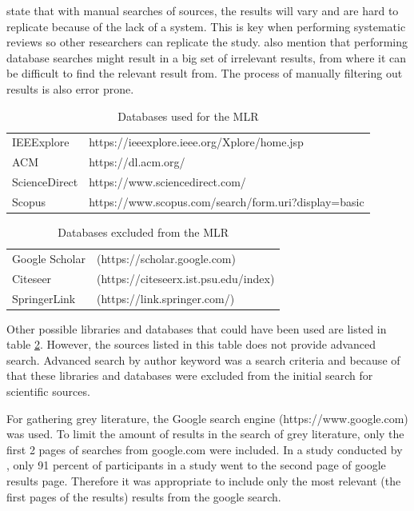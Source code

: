 \documentclass[english, 12pt, a4paper, sci, utf8, a-1b, online]{aaltothesis}
\begin{document}
\textcite{guidelines-for-snowballing} state that with manual searches of sources, the results will vary and are hard to replicate because of the lack of a system. This is key when performing systematic reviews so other researchers can replicate the study. \textcite{guidelines-for-snowballing} also mention that performing database searches might result in a big set of irrelevant results, from where it can be difficult to find the relevant result from. The process of manually filtering out results is also error prone.

\begin{table}
  \centering
  \begin{tabular}{ l l }
    \hline
    IEEExplore    & https://ieeexplore.ieee.org/Xplore/home.jsp          \\
    ACM           & https://dl.acm.org/                                  \\
    ScienceDirect & https://www.sciencedirect.com/                       \\
    Scopus        & https://www.scopus.com/search/form.uri?display=basic \\
    \hline
  \end{tabular}
  \caption{Databases used for the MLR}
  \label{table:included-databases}
\end{table}

\begin{table}
  \centering
  \begin{tabular}{ l l }
    \hline
    Google Scholar & (https://scholar.google.com)          \\
    Citeseer       & (https://citeseerx.ist.psu.edu/index) \\
    SpringerLink   & (https://link.springer.com/)          \\
    \hline
  \end{tabular}
  \caption{Databases excluded from the MLR}
  \label{table:excluded-databases}
\end{table}

Other possible libraries and databases that could have been used are listed in table \ref{table:excluded-databases}. However, the sources listed in this table does not provide advanced search. Advanced search by author keyword was a search criteria and because of that these libraries and databases were excluded from the initial search for scientific sources.

For gathering grey literature, the Google search engine (https://www.google.com) was used. To limit the amount of results in the search of grey literature, only the first 2 pages of searches from google.com were included. In a study conducted by \textcite{google-search}, only 91 percent of participants in a study went to the second page of google results page. Therefore it was appropriate to include only the most relevant (the first pages of the results) results from the google search.
\end{document}
